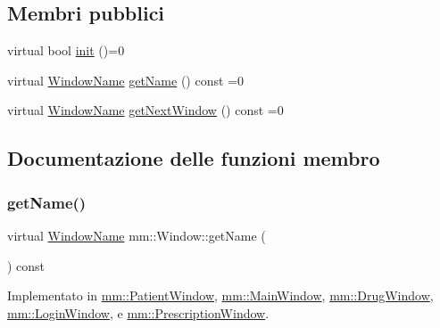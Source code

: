 \subsection*{Membri pubblici}
\begin{DoxyCompactItemize}
\item 
virtual bool \mbox{\hyperlink{classmm_1_1_window_aba03fbf4761b2f106352baecf5996e10}{init}} ()=0
\item 
virtual \mbox{\hyperlink{namespacemm_a4e9d92e04f65dbf2fc1963947da0d93c}{Window\+Name}} \mbox{\hyperlink{classmm_1_1_window_a942c9125bf42156a9f7b7f561e412fed}{get\+Name}} () const =0
\item 
virtual \mbox{\hyperlink{namespacemm_a4e9d92e04f65dbf2fc1963947da0d93c}{Window\+Name}} \mbox{\hyperlink{classmm_1_1_window_a0cd7b4b0feb9505c44503547a161fcd8}{get\+Next\+Window}} () const =0
\end{DoxyCompactItemize}


\subsection{Documentazione delle funzioni membro}
\mbox{\label{classmm_1_1_window_a942c9125bf42156a9f7b7f561e412fed}} 
\subsubsection{\texorpdfstring{get\+Name()}{getName()}}
{\footnotesize\ttfamily virtual \mbox{\hyperlink{namespacemm_a4e9d92e04f65dbf2fc1963947da0d93c}{Window\+Name}} mm\+::\+Window\+::get\+Name (\begin{DoxyParamCaption}{ }\end{DoxyParamCaption}) const\hspace{0.3cm}{\ttfamily [pure virtual]}}



Implementato in \mbox{\hyperlink{classmm_1_1_patient_window_ab951ab5bf21df2b9450496c6faca5268}{mm\+::\+Patient\+Window}}, \mbox{\hyperlink{classmm_1_1_main_window_a8cfdfeb6ad47afff06fa6b1b7fdc0c88}{mm\+::\+Main\+Window}}, \mbox{\hyperlink{classmm_1_1_drug_window_aa33aafc6205abc8c627d0b0a5849895b}{mm\+::\+Drug\+Window}}, \mbox{\hyperlink{classmm_1_1_login_window_aa0597e725bfb2df984f526112080aaf7}{mm\+::\+Login\+Window}}, e \mbox{\hyperlink{classmm_1_1_prescription_window_a0770b1cfa7eef3bfa990d7ddeeb03a39}{mm\+::\+Prescription\+Window}}.

